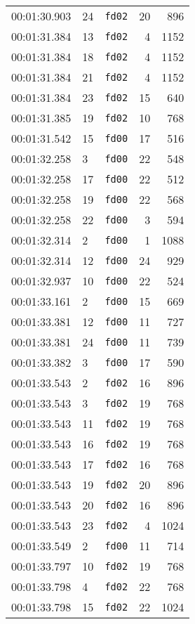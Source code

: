\documentclass{article}
\begin{document}
\begin{longtable}{lllrr}
00:01:30.903 & 24 & \texttt{fd02} & 20 & 896 \\
00:01:31.384 & 13 & \texttt{fd02} & 4 & 1152 \\
00:01:31.384 & 18 & \texttt{fd02} & 4 & 1152 \\
00:01:31.384 & 21 & \texttt{fd02} & 4 & 1152 \\
00:01:31.384 & 23 & \texttt{fd02} & 15 & 640 \\
00:01:31.385 & 19 & \texttt{fd02} & 10 & 768 \\
00:01:31.542 & 15 & \texttt{fd00} & 17 & 516 \\
00:01:32.258 & 3 & \texttt{fd00} & 22 & 548 \\
00:01:32.258 & 17 & \texttt{fd00} & 22 & 512 \\
00:01:32.258 & 19 & \texttt{fd00} & 22 & 568 \\
00:01:32.258 & 22 & \texttt{fd00} & 3 & 594 \\
00:01:32.314 & 2 & \texttt{fd00} & 1 & 1088 \\
00:01:32.314 & 12 & \texttt{fd00} & 24 & 929 \\
00:01:32.937 & 10 & \texttt{fd00} & 22 & 524 \\
00:01:33.161 & 2 & \texttt{fd00} & 15 & 669 \\
00:01:33.381 & 12 & \texttt{fd00} & 11 & 727 \\
00:01:33.381 & 24 & \texttt{fd00} & 11 & 739 \\
00:01:33.382 & 3 & \texttt{fd00} & 17 & 590 \\
00:01:33.543 & 2 & \texttt{fd02} & 16 & 896 \\
00:01:33.543 & 3 & \texttt{fd02} & 19 & 768 \\
00:01:33.543 & 11 & \texttt{fd02} & 19 & 768 \\
00:01:33.543 & 16 & \texttt{fd02} & 19 & 768 \\
00:01:33.543 & 17 & \texttt{fd02} & 16 & 768 \\
00:01:33.543 & 19 & \texttt{fd02} & 20 & 896 \\
00:01:33.543 & 20 & \texttt{fd02} & 16 & 896 \\
00:01:33.543 & 23 & \texttt{fd02} & 4 & 1024 \\
00:01:33.549 & 2 & \texttt{fd00} & 11 & 714 \\
00:01:33.797 & 10 & \texttt{fd02} & 19 & 768 \\
00:01:33.798 & 4 & \texttt{fd02} & 22 & 768 \\
00:01:33.798 & 15 & \texttt{fd02} & 22 & 1024 \\

\end{longtable}
\end{document}
